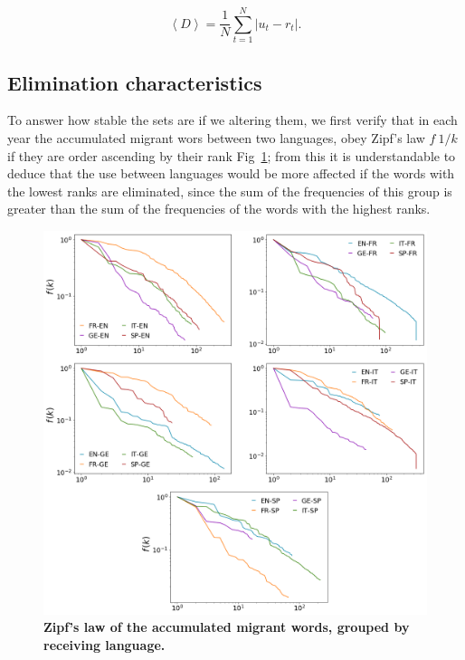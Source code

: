 \documentclass[10pt,letterpaper]{article} %
\begin{document}
	\begin{equation}
	\left\langle D \right\rangle  = \frac{1}{N}\sum_{t=1}^{N} \left| u_{t} - r_{t} \right|  .
	\label{ec.Davg}
	\end{equation}
	
	\subsection*{Elimination characteristics}
	
	To answer how stable the sets are if we altering them, we first verify that in each year the accumulated migrant wors between two languages, obey Zipf's law $f~1/k$ if they are order ascending by their rank Fig~\ref{fig.ZL_receiving}; from this it is understandable to deduce that the use between languages would be more affected if the words with the lowest ranks are eliminated, since the sum of the frequencies of this group is greater than the sum of the frequencies of the words with the highest ranks.
	
	\begin{figure}[!h]
		\begin{adjustwidth}{-2.5cm}{1cm}
			\centering
			\includegraphics[scale=.38]{ZL_receptor.png}
			\caption{{\bf Zipf's law of the accumulated migrant words, grouped by receiving language.} }
			\label{fig.ZL_receiving}
		\end{adjustwidth}
	\end{figure}
	
\end{document}
